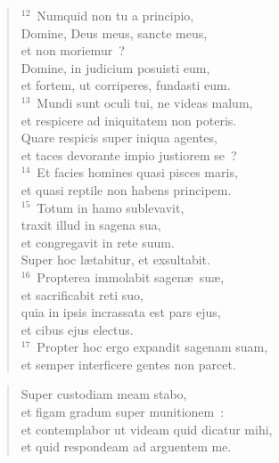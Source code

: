 \begin{flushleft}\begin{verse}${}^{12}$~Numquid non tu a principio,\\ Domine, Deus meus, sancte meus,\\ et non moriemur~?\\ Domine, in judicium posuisti eum,\\ et fortem, ut corriperes, fundasti eum.\\
${}^{13}$~Mundi sunt oculi tui, ne videas malum,\\ et respicere ad iniquitatem non poteris.\\ Quare respicis super iniqua agentes,\\ et taces devorante impio justiorem se~?\\
${}^{14}$~Et facies homines quasi pisces maris,\\ et quasi reptile non habens principem.\\
${}^{15}$~Totum in hamo sublevavit,\\ traxit illud in sagena sua,\\ et congregavit in rete suum.\\ Super hoc l\ae tabitur, et exsultabit.\\
${}^{16}$~Propterea immolabit sagen\ae\ su\ae ,\\ et sacrificabit reti suo,\\ quia in ipsis incrassata est pars ejus,\\ et cibus ejus electus.\\
${}^{17}$~Propter hoc ergo expandit sagenam suam,\\ et semper interficere gentes non parcet.\end{verse}\end{flushleft}


\begin{flushleft}\begin{verse}\vspace{-19pt}Super custodiam meam stabo,\\ et figam gradum super munitionem~:\\ et contemplabor ut videam quid dicatur mihi,\\ et quid respondeam ad arguentem me.\end{verse}\end{flushleft}


